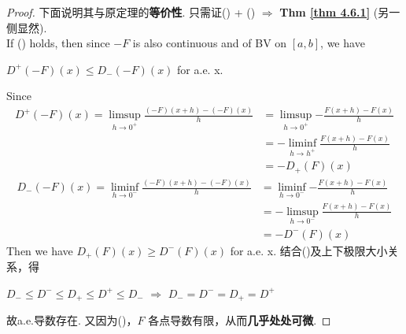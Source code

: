 \begin{thm}
\begin{rmk}
\begin{itemize}
				\vspace{2em}
				\begin{proof}
					下面说明其与原定理的\textbf{等价性}. 只需证() + () $\Rightarrow$ \textbf{Thm \ref{thm 4.6.1}} (另一侧显然). \\
					If () holds, then since $-F$ is also continuous and of BV on $[a , b]$, we have
					\begin{center}
						$D^{+}(-F)(x) \leq D_{-}(-F)(x)$ for a.e. x.
					\end{center}
					Since
					\begin{align}
						D^{+}(-F)(x)
						= \limsup_{h \to 0^{+}}{\frac{(-F)(x + h) - (-F)(x)}{h}}
						&= \limsup_{h \to 0^{+}}{-\frac{F(x + h) - F(x)}{h}} \\
						&= -\liminf_{h \to h^{+}}{\frac{F(x + h) - F(x)}{h}} \\
						&= -D_{+}(F)(x)
					\end{align}
					\begin{align}
						D_{-}(-F)(x) 
						= \liminf_{h \to 0^{-}}{\frac{(-F)(x + h) - (-F)(x)}{h}}
						&= \liminf_{h \to 0^{-}}{-\frac{F(x + h) - F(x)}{h}} \\
						&= -\limsup_{h \to 0^{-}}{\frac{F(x + h) - F(x)}{h}} \\
						&= -D^{-}(F)(x)
					\end{align}
					Then we have $D_{+}(F)(x) \geq D^{-}(F)(x)$ for a.e. x. 结合()及上下极限大小关系，得
					\begin{center}
						$D_{-} \leq D^{-} \leq D_{+} \leq D^{+} \leq D_{-} \,\, \Rightarrow \,\, D_{-} = D^{-} = D_{+} = D^{+}$
					\end{center}
					故a.e.导数存在. 又因为()，$F$ 各点导数有限，从而\textbf{几乎处处可微}.
				\end{proof}
			\end{itemize}
		\end{rmk}
		

\end{thm}
